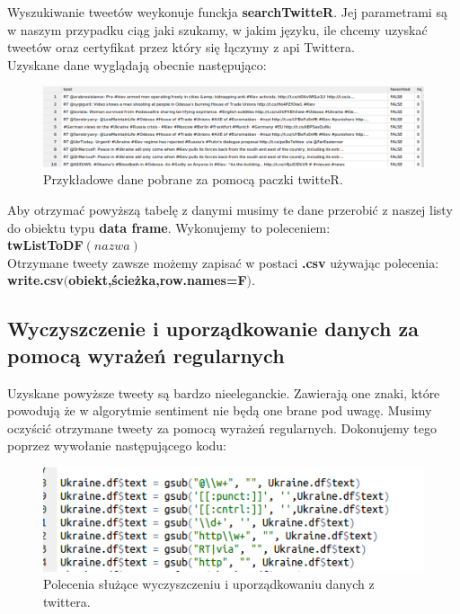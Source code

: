 \documentclass[12pt,a4paper]{article}
\begin{document}
Wyszukiwanie tweetów weykonuje funckja \textbf{searchTwitteR}. Jej parametrami są w naszym przypadku ciąg jaki szukamy, w jakim języku, ile chcemy uzyskać tweetów oraz certyfikat przez który się łączymy z api Twittera. \\
Uzyskane dane wyglądają obecnie następująco: \\
\begin{figure}[H]
\begin{center}
\includegraphics[scale=0.45]{pictures/Data1.png}
\caption{Przykładowe dane pobrane za pomocą paczki twitteR.}
\end{center}
\end{figure}

Aby otrzymać powyższą tabelę z danymi musimy te dane przerobić z naszej listy do obiektu typu \textbf{data frame}. Wykonujemy to poleceniem:\\ \textbf{twListToDF$(nazwa)$} \\
Otrzymane tweety zawsze możemy zapisać w postaci \textbf{.csv} używając polecenia: \\
\textbf{write.csv$($obiekt,ścieżka,row.names=F$)$}.

\subsection[Wyczyszczenie i uporządkowanie danych za pomocą wyrażeń regularnych]{Wyczyszczenie i uporządkowanie danych za pomocą wyrażeń regularnych}
Uzyskane powyższe tweety są bardzo nieeleganckie. Zawierają one znaki, które powodują że w algorytmie sentiment nie będą one brane pod uwagę. Musimy oczyścić otrzymane tweety za pomocą wyrażeń regularnych. Dokonujemy tego poprzez wywołanie następującego kodu: \\
\begin{figure}[H]
\begin{center}
\includegraphics[scale=0.5]{pictures/Code3.png}
\caption{Polecenia służące wyczyszczeniu i uporządkowaniu danych z twittera.}
\end{center}
\end{figure}
\end{document}
